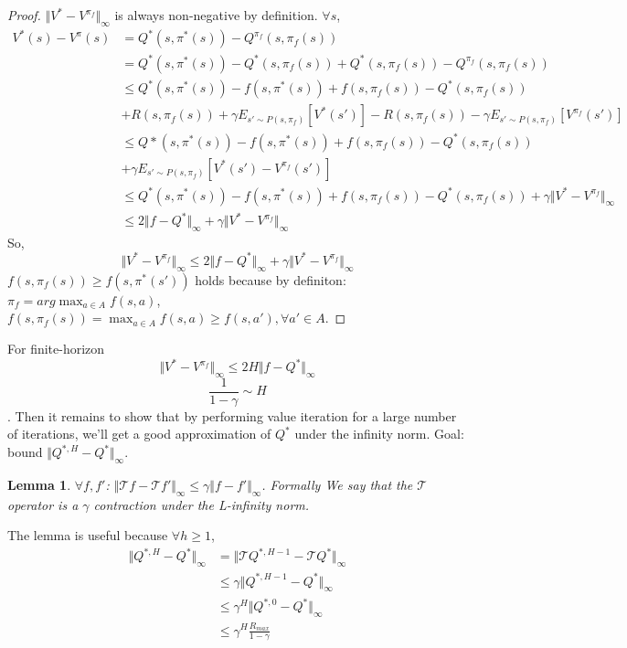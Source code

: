\documentclass{report}
\newtheorem{lemma}[theorem]{Lemma}
\begin{document}
\begin{proof}
$\Vert V^*-V^{\pi_f}\Vert_{\infty}$ is always non-negative by definition. $\forall s$, 
\begin{equation*}
\begin{split}
V^{*}(s)-V^{\pi}(s) &= Q^*(s,\pi^*(s))-Q^{\pi_f}(s,\pi_f(s))\\
&= Q^*(s,\pi^*(s))-Q^*(s,\pi_f(s))+Q^*(s,\pi_f(s))-Q^{\pi_f}(s,\pi_f(s))\\
&\leq Q^*(s,\pi^{*}(s))-f(s,\pi^{*}(s))+f(s,\pi_f(s))-Q^*(s,\pi_f(s))\\
& +R(s,\pi_f(s))+\gamma E_{s'\sim P(s,\pi_f)}[V^*(s')]-R(s,\pi_f(s)) - \gamma E_{s'\sim P(s,\pi_f)}[V^{\pi_f}(s')] \\
&\leq Q*(s,\pi^{*}(s))-f(s,\pi^{*}(s))+f(s,\pi_f(s))-Q^*(s,\pi_f(s))\\
&+ \gamma E_{s'\sim P(s,\pi_f)}[V^*(s')-V^{\pi_f}(s')] \\
&\leq Q^*(s,\pi^{*}(s))-f(s,\pi^{*}(s))+f(s,\pi_f(s))-Q^*(s,\pi_f(s)) + \gamma \Vert V^*-V^{\pi_f} \Vert_{\infty} \\
&\leq 2\Vert f-Q^*\Vert_{\infty} + \gamma \Vert V^*-V^{\pi_f} \Vert_{\infty}
\end{split}
\end{equation*}
So, \[
\Vert V^*-V^{\pi_f} \Vert_{\infty} \leq 2\Vert f-Q^*\Vert_{\infty} + \gamma \Vert V^*-V^{\pi_f} \Vert_{\infty}
\]
$f(s,\pi_f(s)) \geq f(s,\pi^*(s'))$ holds because by definiton: $\pi_f=arg\max_{a\in A}f(s,a)$, $f(s,\pi_f(s))=\max_{a\in A}f(s,a) \geq f(s,a'), \forall a' \in A$.
\end{proof}
For finite-horizon \[\Vert  V^*-V^{ \pi_f} \Vert_{\infty} \leq 2 H \Vert f-Q^{*}\Vert_{\infty}\]
\[\frac{1}{1-\gamma} \sim H\].
Then it remains to show that by performing value iteration for a large number of iterations, we'll get a good  approximation of $Q^*$ under the infinity norm. Goal: bound $\Vert Q^{*,H}-Q^{*}\Vert_{\infty}$.
\begin{lemma}
$\forall f,f'$: $\Vert\mathcal{T}f-\mathcal{T}f'\Vert_{\infty}\leq \gamma \Vert f-f'\Vert_{\infty}$. Formally We say that the $\mathcal{T}$ operator is a $\gamma$ contraction under the L-infinity norm.
\end{lemma}
The lemma is useful because $\forall h \geq 1$, 
\begin{equation*}
\begin{split}
    \Vert Q^{*,H}-Q^{*}\Vert_{\infty}&=\Vert \mathcal{T}Q^{*,H-1}-\mathcal{T}Q^{*}\Vert_{\infty}\\
    & \leq \gamma \Vert Q^{*,H-1}-Q^{*}\Vert_{\infty} \\
    & \leq \gamma^H \Vert Q^{*,0}-Q^{*}\Vert_{\infty} \\
    & \leq \gamma^{H} \frac{R_{max}}{1-\gamma}
\end{split}
\end{equation*}
\end{document}
